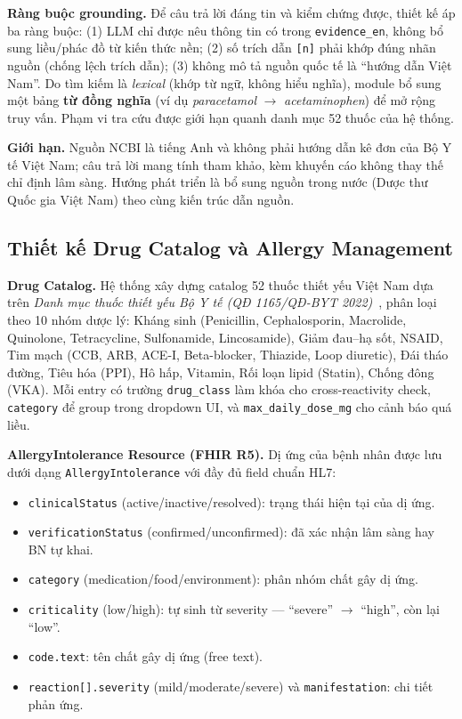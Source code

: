 \documentclass[a4paper,13pt,3p,oneside]{report}
\theoremstyle{definition}
\theoremstyle{remark}
\theoremstyle{definition}
\begin{document}
\textbf{Ràng buộc grounding.} Để câu trả lời đáng tin và kiểm chứng được, thiết kế áp ba ràng buộc: (1) LLM chỉ được nêu thông tin có trong \texttt{evidence\_en}, không bổ sung liều/phác đồ từ kiến thức nền; (2) số trích dẫn \texttt{[n]} phải khớp đúng nhãn nguồn (chống lệch trích dẫn); (3) không mô tả nguồn quốc tế là ``hướng dẫn Việt Nam''. Do tìm kiếm là \textit{lexical} (khớp từ ngữ, không hiểu nghĩa), module bổ sung một bảng \textbf{từ đồng nghĩa} (ví dụ \textit{paracetamol} $\to$ \textit{acetaminophen}) để mở rộng truy vấn. Phạm vi tra cứu được giới hạn quanh danh mục 52 thuốc của hệ thống.

\textbf{Giới hạn.} Nguồn NCBI là tiếng Anh và không phải hướng dẫn kê đơn của Bộ Y tế Việt Nam; câu trả lời mang tính tham khảo, kèm khuyến cáo không thay thế chỉ định lâm sàng. Hướng phát triển là bổ sung nguồn trong nước (Dược thư Quốc gia Việt Nam) theo cùng kiến trúc dẫn nguồn.

\subsection{Thiết kế Drug Catalog và Allergy Management}

\textbf{Drug Catalog.} Hệ thống xây dựng catalog 52 thuốc thiết yếu Việt Nam dựa trên \textit{Danh mục thuốc thiết yếu Bộ Y tế (QĐ 1165/QĐ-BYT 2022)}~\cite{qd1165}, phân loại theo 10 nhóm dược lý: Kháng sinh (Penicillin, Cephalosporin, Macrolide, Quinolone, Tetracycline, Sulfonamide, Lincosamide), Giảm đau--hạ sốt, NSAID, Tim mạch (CCB, ARB, ACE-I, Beta-blocker, Thiazide, Loop diuretic), Đái tháo đường, Tiêu hóa (PPI), Hô hấp, Vitamin, Rối loạn lipid (Statin), Chống đông (VKA). Mỗi entry có trường \texttt{drug\_class} làm khóa cho cross-reactivity check, \texttt{category} để group trong dropdown UI, và \texttt{max\_daily\_dose\_mg} cho cảnh báo quá liều.

\textbf{AllergyIntolerance Resource (FHIR R5).} Dị ứng của bệnh nhân được lưu dưới dạng \texttt{AllergyIntolerance} với đầy đủ field chuẩn HL7:
\begin{itemize}
  \item \texttt{clinicalStatus} (active/inactive/resolved): trạng thái hiện tại của dị ứng.
  \item \texttt{verificationStatus} (confirmed/unconfirmed): đã xác nhận lâm sàng hay BN tự khai.
  \item \texttt{category} (medication/food/environment): phân nhóm chất gây dị ứng.
  \item \texttt{criticality} (low/high): tự sinh từ severity --- ``severe'' $\to$ ``high'', còn lại ``low''.
  \item \texttt{code.text}: tên chất gây dị ứng (free text).
  \item \texttt{reaction[].severity} (mild/moderate/severe) và \texttt{manifestation}: chi tiết phản ứng.
\end{itemize}
\end{document}

